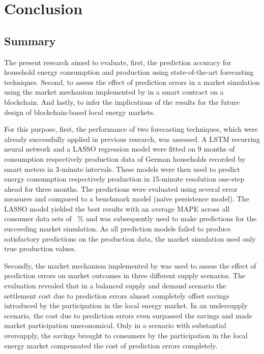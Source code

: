 
\section{Conclusion}\label{Sec:Conc}




\subsection{Summary}\label{Sec:Conclusion;Subsec:Summary}

The present research aimed to evaluate, first, the prediction accuracy for household energy consumption and production using state-of-the-art forecasting techniques. Second, to assess the effect of prediction errors in a market simulation using the market mechanism implemented by \citet{Mengelkamp:2018a} in a smart contract on a blockchain. And lastly, to infer the implications of the results for the future design of blockchain-based local energy markets.

For this purpose, first, the performance of two forecasting techniques, which were already successfully applied in previous research, was assessed. A LSTM recurring neural network and a LASSO regression model were fitted on 9 months of consumption respectively production data of German households recorded by smart meters in 3-minute intervals. These models were then used to predict energy consumption respectively production in 15-minute resolution one-step ahead for three months. The predictions were evaluated using several error measures and compared to a benchmark model (na\"ive persistence model). The LASSO model yielded the best results with an average MAPE across all consumer data sets of ~\% and was subsequently used to make predictions for the succeeding market simulation. As all prediction models failed to produce satisfactory predictions on the production data, the market simulation used only true production values.

Secondly, the market mechanism implemented by \citet{Mengelkamp:2018a} was used to assess the effect of prediction errors on market outcomes in three different supply scenarios. The evaluation revealed that in a balanced supply and demand scenario the settlement cost due to prediction errors almost completely offset savings introduced by the participation in the local energy market. In an undersupply scenario, the cost due to prediction errors even surpassed the savings and made market participation uneconomical. Only in a scenario with substantial oversupply, the savings brought to consumers by the participation in the local energy market compensated the cost of prediction errors completely.

